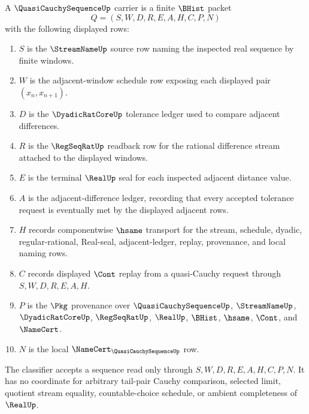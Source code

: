\begin{definition}
\label{def:quasi-cauchy-sequence-carrier}
A $\QuasiCauchySequenceUp$ carrier is a finite $\BHist$ packet
$$
Q=(S,W,D,R,E,A,H,C,P,N)
$$
with the following displayed rows:
\begin{enumerate}
\item $S$ is the $\StreamNameUp$ source row naming the inspected real sequence by finite windows.
\item $W$ is the adjacent-window schedule row exposing each displayed pair $(x_n,x_{n+1})$.
\item $D$ is the $\DyadicRatCoreUp$ tolerance ledger used to compare adjacent differences.
\item $R$ is the $\RegSeqRatUp$ readback row for the rational difference stream attached to the displayed windows.
\item $E$ is the terminal $\RealUp$ seal for each inspected adjacent distance value.
\item $A$ is the adjacent-difference ledger, recording that every accepted tolerance request is eventually met by the displayed adjacent rows.
\item $H$ records componentwise $\hsame$ transport for the stream, schedule, dyadic, regular-rational, Real-seal, adjacent-ledger, replay, provenance, and local naming rows.
\item $C$ records displayed $\Cont$ replay from a quasi-Cauchy request through $S,W,D,R,E,A,H$.
\item $P$ is the $\Pkg$ provenance over $\QuasiCauchySequenceUp$, $\StreamNameUp$, $\DyadicRatCoreUp$, $\RegSeqRatUp$, $\RealUp$, $\BHist$, $\hsame$, $\Cont$, and $\NameCert$.
\item $N$ is the local $\NameCert_{\QuasiCauchySequenceUp}$ row.
\end{enumerate}
The classifier accepts a sequence read only through $S,W,D,R,E,A,H,C,P,N$. It has no coordinate for arbitrary tail-pair Cauchy comparison, selected limit, quotient stream equality, countable-choice schedule, or ambient completeness of $\RealUp$.
\end{definition}


